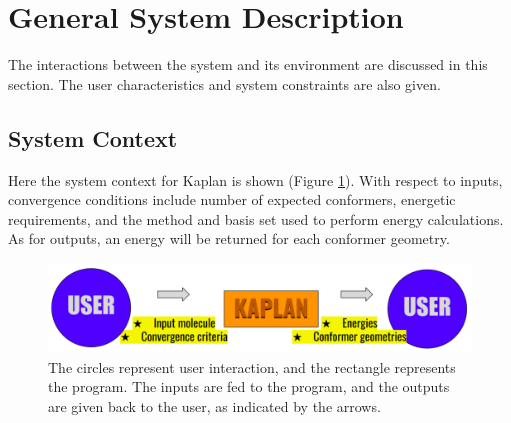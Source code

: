 \documentclass[12pt]{article}
\begin{document}
\section{General System Description} \label{sys-desc}

The interactions between the system and its environment are discussed in this 
section. The user characteristics and system constraints are also given.

\subsection{System Context}

\noindent Here the system context for Kaplan is shown (Figure 
\ref{sys-context}). With 
respect to inputs, convergence conditions include number of expected 
conformers, energetic requirements, and the method and basis set used to 
perform energy calculations. As for outputs, an energy 
will be returned for each 
conformer geometry. 



\begin{figure}[H]
	\includegraphics[width=\textwidth]{sys-context}
	\caption{The circles represent user interaction, and the rectangle 
	represents the program. The inputs are fed to the program, and the 
	outputs are given back to the user, as indicated by the arrows.}
	\label{sys-context}
\end{figure}
\end{document}
